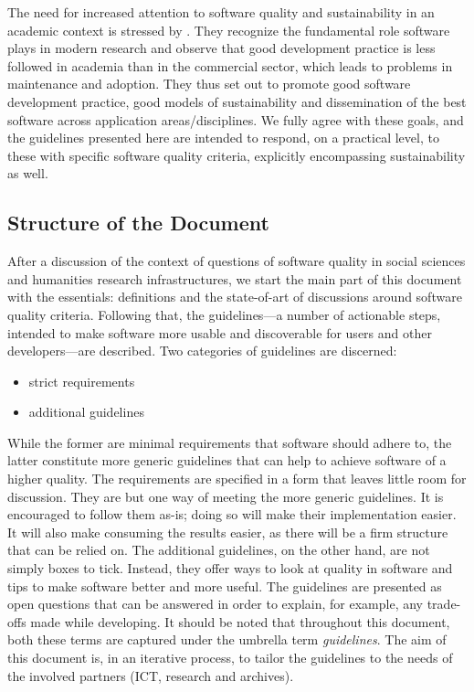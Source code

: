 \documentclass[a4paper,11pt]{article}
\begin{document}
The need for increased attention to software quality and sustainability in an
academic context is stressed by
\cite{RESEARCHSOFTWARE}.
They recognize the fundamental role software plays in modern research and
observe that good development practice is less followed in academia than in the
commercial sector, which leads to problems in maintenance and adoption. They thus set out to promote good software development practice, good models of
sustainability and dissemination of the best software across application
areas/disciplines. We fully agree with these goals, and the guidelines presented here are
intended to respond, on a practical level, to these with specific software
quality criteria, explicitly encompassing sustainability as well.

\subsection{Structure of the Document}\label{sec:struc}
After a discussion of the context of questions of software quality in social sciences and humanities research infrastructures,
we start the main part of this document with the essentials: definitions and the state-of-art
of discussions around software quality criteria. 
Following that, the guidelines---a number of actionable steps, intended to make software more usable and discoverable for users and other developers---are described. Two categories of guidelines are discerned: 
\begin{itemize}
	\item strict requirements
	\item additional guidelines %
\end{itemize}
While the former are minimal requirements that software should adhere to, the latter constitute more generic guidelines that can help to achieve software of a higher quality. 
The requirements are specified in a form that leaves little room for discussion. They are but one way of meeting the more generic guidelines. It is encouraged to follow them as-is; doing so will make their implementation easier. It will also make consuming the results easier, as there will be a firm structure that can be relied on.
The additional guidelines, on the other hand, are not simply boxes to tick. Instead, they offer ways to look at quality in software and tips to make software better and more useful. The guidelines are presented as open questions that can be answered in order to explain, for example, any trade-offs made while developing. 
It should be noted that throughout this document, both these terms are captured under the umbrella term \textit{guidelines}. 
The aim of this document %
is, in an iterative
process, to tailor the guidelines to the needs of the involved partners (ICT, research and archives). 
\end{document}
